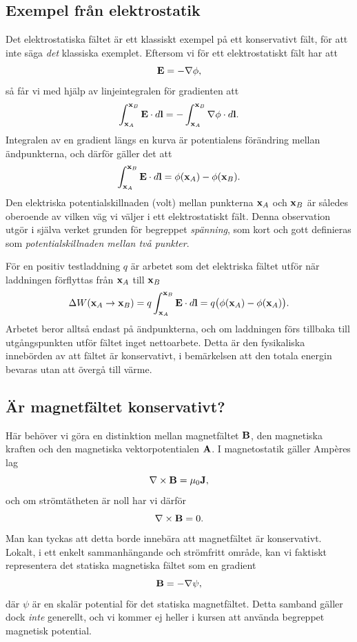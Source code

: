 \subsection{Exempel fr{\aa}n elektrostatik}
Det elektrostatiska f{\"a}ltet {\"a}r ett klassiskt exempel p{\aa} ett
konservativt f{\"a}lt, f{\"o}r att inte s{\"a}ga {\it det} klassiska
exemplet. Eftersom vi f{\"o}r ett elektro\-statiskt f{\"a}lt har att
$$
  {\bf E}=-\nabla\phi,
$$
s{\aa} f{\aa}r vi med hj{\"a}lp av linjeintegralen f{\"o}r gradienten att
$$
  \int^{{\bf x}_B}_{{\bf x}_A}{\bf E}\cdot d{\bf l}
    =-\int^{{\bf x}_B}_{{\bf x}_A}\nabla\phi\cdot d{\bf l}.
$$
Integralen av en gradient l{\"a}ngs en kurva {\"a}r potentialens
f{\"o}r{\"a}ndring mellan {\"a}ndpunkterna, och d{\"a}rf{\"o}r g{\"a}ller
det att
$$
  \int^{{\bf x}_B}_{{\bf x}_A}{\bf E}\cdot d{\bf l}=\phi({\bf x}_A)-\phi({\bf x}_B).
$$
Den elektriska potentialskillnaden (volt) mellan punkterna ${\bf x}_A$ och
${\bf x}_B$ {\"a}r s{\aa}ledes oberoende av vilken v{\"a}g vi v{\"a}ljer i
ett elektrostatiskt f{\"a}lt. Denna observation utg{\"o}r i sj{\"a}lva verket
grunden f{\"o}r begreppet {\it sp{\"a}nning}, som kort och gott definieras som
{\it potentialskillnaden mellan tv{\aa} punkter}.

F{\"o}r en positiv testladdning $q$ {\"a}r arbetet som det elektriska
f{\"a}ltet utf{\"o}r n{\"a}r laddningen f{\"o}rflyttas fr{\aa}n ${\bf x}_A$
till ${\bf x}_B$
$$
  \Delta W({\bf x}_A\to{\bf x}_B)=q\int^{{\bf x}_B}_{{\bf x}_A}
    {\bf E}\cdot d{\bf l} =q\big(\phi({\bf x}_A)-\phi({\bf x}_A)\big).
$$
Arbetet beror allts{\aa} endast p{\aa} {\"a}ndpunkterna, och om laddningen
f{\"o}rs tillbaka till utg{\aa}ngspunkten utf{\"o}r f{\"a}ltet inget
nettoarbete. Detta {\"a}r den fysikaliska inneb{\"o}rden av att f{\"a}ltet
{\"a}r konservativt, i bem{\"a}rkelsen att den totala energin bevaras utan
att {\"o}verg{\aa} till v{\"a}rme.

\subsection{{\"A}r magnetf{\"a}ltet konservativt?}
H{\"a}r beh{\"o}ver vi g{\"o}ra en distinktion mellan magnetf{\"a}ltet%
${\bf B}$, den magnetiska kraften och den magnetiska vektorpotentialen
${\bf A}$. I magnetostatik g{\"a}ller Amp{\`e}res lag
$$
  \nabla\times{\bf B}=\mu_0{\bf J},
$$
och om str{\"o}mt{\"a}theten {\"a}r noll har vi d{\"a}rf{\"o}r
$$
  \nabla\times{\bf B}=0.
$$
Man kan tyckas att detta borde inneb{\"a}ra att magnetf{\"a}ltet {\"a}r
konservativt. Lokalt, i ett enkelt sammanh{\"a}ngande och str{\"o}mfritt
omr{\aa}de, kan vi faktiskt representera det statiska magnetiska f{\"a}ltet
som en gradient
$$
  {\bf B}=-\nabla\psi,
$$
d{\"a}r $\psi$ {\"a}r en skal{\"a}r potential f{\"o}r det statiska
magnetf{\"a}ltet. Detta samband g{\"a}ller dock {\it inte} generellt,
och vi kommer ej heller i kursen att anv{\"a}nda begreppet magnetisk potential.

